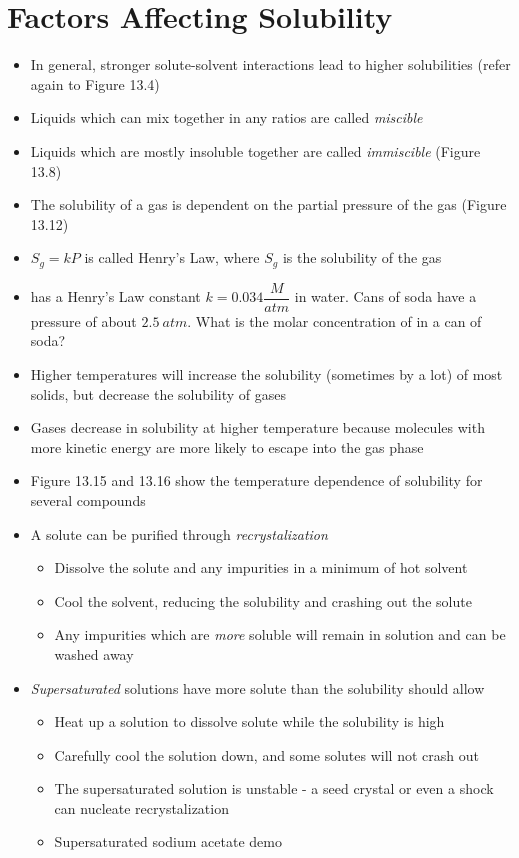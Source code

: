 \documentclass[12pt, openany, letterpaper]{memoir}
\begin{document}
\section{Factors Affecting Solubility}
\begin{itemize}
  \item In general, stronger solute-solvent interactions lead to higher solubilities (refer again to Figure 13.4)
	\item Liquids which can mix together in any ratios are called \emph{miscible}
	\item Liquids which are mostly insoluble together are called \emph{immiscible} (Figure 13.8)
	\item The solubility of a gas is dependent on the partial pressure of the gas (Figure 13.12)
	\item $S_g = kP$ is called Henry's Law, where $S_g$ is the solubility of the gas
	\item {} has a Henry's Law constant $k=0.034\dfrac{M}{atm}$ in water. Cans of soda have a pressure of about $2.5~atm$. What is the molar concentration of  in a can of soda?
	\item Higher temperatures will increase the solubility (sometimes by a lot) of most solids, but decrease the solubility of gases
	\item Gases decrease in solubility at higher temperature because molecules with more kinetic energy are more likely to escape into the gas phase
	\item Figure 13.15 and 13.16 show the temperature dependence of solubility for several compounds
	\item A solute can be purified through \emph{recrystalization}
	\begin{itemize}
		\item Dissolve the solute and any impurities in a minimum of hot solvent
		\item Cool the solvent, reducing the solubility and crashing out the solute
		\item Any impurities which are \emph{more} soluble will remain in solution and can be washed away
	\end{itemize}
	\item \emph{Supersaturated} solutions have more solute than the solubility should allow
	\begin{itemize}
		\item Heat up a solution to dissolve solute while the solubility is high
		\item Carefully cool the solution down, and some solutes will not crash out
		\item The supersaturated solution is unstable - a seed crystal or even a shock can nucleate recrystalization
		\item Supersaturated sodium acetate demo
	\end{itemize}
\end{itemize}
\end{document}
